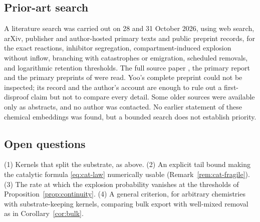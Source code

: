 \documentclass[11pt,a4paper]{article}
\numberwithin{equation}{section}
\theoremstyle{definition}\newtheorem{definition}[theorem]{Definition}
\theoremstyle{remark}\newtheorem{remark}[theorem]{Remark}\newtheorem{example}[theorem]{Example}
\begin{document}
\subsection{Prior-art search}
A literature search was carried out on 28 and 31 October 2026, using web search, arXiv, publisher and author-hosted primary texts and public preprint records, for the exact reactions, inhibitor segregation, compartment-induced explosion without inflow, branching with catastrophes or emigration, scheduled removals, and logarithmic retention thresholds. The full source paper \cite{AHRLL2026}, the primary report \cite{LeskelaRobertSimatos2009} and the primary preprints of \cite{HermannPfaffelhuber2020,GalloRoldanCorrea2026} were read. Yoo's complete preprint \cite{Yoo2026} could not be inspected; its record and the author's account are enough to rule out a first-disproof claim but not to compare every detail. Some older sources were available only as abstracts, and no author was contacted. No earlier statement of these chemical embeddings was found, but a bounded search does not establish priority.

\subsection{Open questions}
(1) Kernels that split the substrate, as above. (2) An explicit tail bound making the catalytic formula \eqref{eq:cat-law} numerically usable (Remark~\ref{rem:cat-fragile}). (3) The rate at which the explosion probability vanishes at the thresholds of Proposition~\ref{prop:continuity}. (4) A general criterion, for arbitrary chemistries with substrate-keeping kernels, comparing bulk export with well-mixed removal as in Corollary~\ref{cor:bulk}.

\appendix
\end{document}
